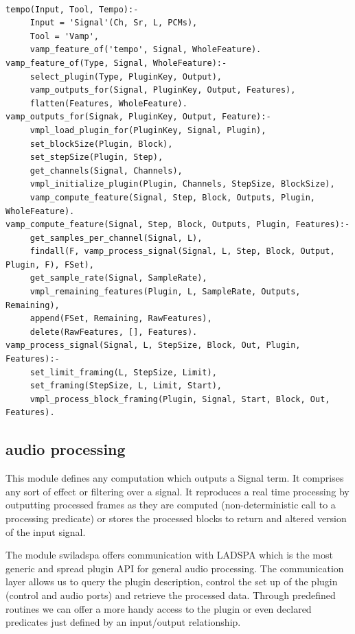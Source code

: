 \documentclass[runningheads]{llncs}
\begin{document}
\begin{verbatim}

tempo(Input, Tool, Tempo):-
     Input = 'Signal'(Ch, Sr, L, PCMs),
     Tool = 'Vamp',
     vamp_feature_of('tempo', Signal, WholeFeature).
vamp_feature_of(Type, Signal, WholeFeature):-
     select_plugin(Type, PluginKey, Output),
     vamp_outputs_for(Signal, PluginKey, Output, Features),
     flatten(Features, WholeFeature).
vamp_outputs_for(Signak, PluginKey, Output, Feature):-
     vmpl_load_plugin_for(PluginKey, Signal, Plugin),
     set_blockSize(Plugin, Block),
     set_stepSize(Plugin, Step),
     get_channels(Signal, Channels),
     vmpl_initialize_plugin(Plugin, Channels, StepSize, BlockSize),
     vamp_compute_feature(Signal, Step, Block, Outputs, Plugin, WholeFeature).
vamp_compute_feature(Signal, Step, Block, Outputs, Plugin, Features):-
     get_samples_per_channel(Signal, L),
     findall(F, vamp_process_signal(Signal, L, Step, Block, Output, Plugin, F), FSet),
     get_sample_rate(Signal, SampleRate),
     vmpl_remaining_features(Plugin, L, SampleRate, Outputs, Remaining),
     append(FSet, Remaining, RawFeatures),
     delete(RawFeatures, [], Features).
vamp_process_signal(Signal, L, StepSize, Block, Out, Plugin, Features):-
     set_limit_framing(L, StepSize, Limit),
     set_framing(StepSize, L, Limit, Start),
     vmpl_process_block_framing(Plugin, Signal, Start, Block, Out, Features).

\end{verbatim}
\noindent

\subsection{audio processing}\label{subsec:swilasdpa}

This module defines any computation which outputs a Signal term. It comprises any sort of effect or filtering over a signal. It reproduces a real time processing by outputting processed frames as they are computed (non-deterministic call to a processing predicate) or stores the processed blocks to return and altered version of the input signal. 

The module swiladspa offers communication with LADSPA which is the most generic and spread plugin API for general audio processing. The communication layer allows us to query the plugin description, control the set up of the plugin (control and audio ports) and retrieve the processed data. Through predefined routines we can offer a more handy access to the plugin or even declared predicates just defined by an input/output relationship.
\end{document}
